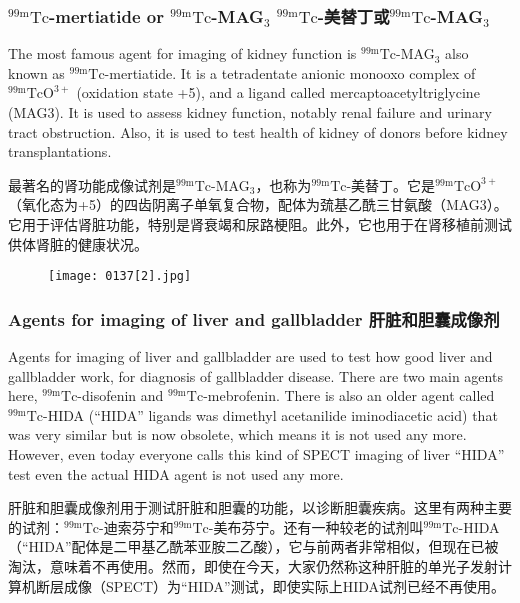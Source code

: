 \documentclass[dvipsnames, svgnames,a4paper,11pt]{article}
\begin{document}
\subsubsection{${}^\mathrm{99m}\mathrm{Tc}$-mertiatide or ${}^\mathrm{99m}\mathrm{Tc}$-MAG${}_3$ ${}^\mathrm{99m}\mathrm{Tc}$-美替丁或${}^\mathrm{99m}\mathrm{Tc}$-MAG${}_3$}

The most famous agent for imaging of kidney function is ${}^\mathrm{99m}\mathrm{Tc}$-MAG${}_3$ also known as
${}^\mathrm{99m}\mathrm{Tc}$-mertiatide. It is a tetradentate anionic monooxo complex of ${}^\mathrm{99m}\mathrm{TcO^{3+}}$ (oxidation
state +5), and a ligand called mercaptoacetyltriglycine (MAG3). It is used to assess
kidney function, notably renal failure and urinary tract obstruction. Also, it is used to
test health of kidney of donors before kidney transplantations.

最著名的肾功能成像试剂是${}^\mathrm{99m}\mathrm{Tc}$-MAG${}_3$，也称为${}^\mathrm{99m}\mathrm{Tc}$-美替丁。它是${}^\mathrm{99m}\mathrm{TcO^{3+}}$（氧化态为+5）的四齿阴离子单氧复合物，配体为巯基乙酰三甘氨酸（MAG3）。它用于评估肾脏功能，特别是肾衰竭和尿路梗阻。此外，它也用于在肾移植前测试供体肾脏的健康状况。

\begin{figure}[h]
	\centering
    \texttt{[image: 0137[2].jpg]}    
     \label{fig141}
\end{figure}

\subsubsection{Agents for imaging of liver and gallbladder 肝脏和胆囊成像剂}

Agents for imaging of liver and gallbladder are used to test how good liver and
gallbladder work, for diagnosis of gallbladder disease. There are two main agents
here, ${}^\mathrm{99m}\mathrm{Tc}$-disofenin and ${}^\mathrm{99m}\mathrm{Tc}$-mebrofenin. There is also an older agent called
${}^\mathrm{99m}\mathrm{Tc}$-HIDA (“HIDA” ligands was dimethyl acetanilide iminodiacetic acid) that was
very similar but is now obsolete, which means it is not used any more. However,
even today everyone calls this kind of SPECT imaging of liver “HIDA” test even the
actual HIDA agent is not used any more.


肝脏和胆囊成像剂用于测试肝脏和胆囊的功能，以诊断胆囊疾病。这里有两种主要的试剂：${}^\mathrm{99m}\mathrm{Tc}$-迪索芬宁和${}^\mathrm{99m}\mathrm{Tc}$-美布芬宁。还有一种较老的试剂叫${}^\mathrm{99m}\mathrm{Tc}$-HIDA（“HIDA”配体是二甲基乙酰苯亚胺二乙酸），它与前两者非常相似，但现在已被淘汰，意味着不再使用。然而，即使在今天，大家仍然称这种肝脏的单光子发射计算机断层成像（SPECT）为“HIDA”测试，即使实际上HIDA试剂已经不再使用。
\end{document}
